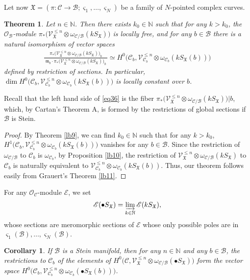 \documentclass[12pt,a4paper,notitlepage]{article}
\theoremstyle{definition}
\theoremstyle{plain}
\newtheorem{thm}[df]{Theorem}
\newtheorem{co}[df]{Corollary}
\newcommand{\fk}{\mathfrak}
\newcommand{\mc}{\mathcal}
\newcommand{\scr}{\mathscr}
\newcommand{\sgm}{\varsigma}
\newcommand{\SX}{S_{\fk X}}
\newcommand{\mbb}{\mathbb}
\newcommand{\blt}{\bullet}
\newcommand{\Nbb}{\mathbb N}
\numberwithin{equation}{section}
\begin{document}
Let now $\fk X=(\pi:\mc C\rightarrow\mc B;\sgm_1,\dots,\sgm_N)$ be a family of $N$-pointed complex curves.

\begin{thm}\label{lb8}
Let $n\in\Nbb$. Then  there exists $k_0\in\mbb N$ such that for any $k>k_0$, the $\scr O_{\mc B}$-module  $\pi_*\big(\scr V_{\fk X}^{\leq n}\otimes\omega_{\mc C/\mc B}(k\SX)\big)$ is locally free, and for any $b\in\mc B$ there is a natural isomorphism of vector spaces
\begin{align}
	\frac{\pi_*\big(\scr V_{\fk X}^{\leq n}\otimes\omega_{\mc C/\mc B}(k\SX)\big)_b}{~\fk m_b\cdot\pi_*\big(\scr V_{\fk X}^{\leq n}\otimes\omega_{\mc C/\mc B}(k\SX)\big)_b~}\simeq H^0\big(\mc C_b,\scr V_{\mc C_b}^{\leq n}\otimes\omega_{\mc C_b}(k\SX(b))\big)\label{eq36}
\end{align} 
defined by  restriction of sections. In particular,  $\dim  H^0\big(\mc C_b,\scr V_{\mc C_b}^{\leq n}\otimes\omega_{\mc C_b}(k\SX(b))\big)$ is locally constant over $b$.
\end{thm}

Recall that the left hand side of \eqref{eq36} is the fiber $\pi_*\big(\scr V_{\fk X}^{\leq n}\otimes\omega_{\mc C/\mc B}(k\SX)\big)\big|b$, which, by Cartan's Theorem A, is formed by the restrictions of global sections if $\mc B$ is Stein.

\begin{proof}
By Theorem \ref{lb9}, we can find $k_0\in\Nbb$ such that for any $k>k_0$, $H^1\big(\mc C_b,\scr V_{\mc C_b}^{\leq n}\otimes\omega_{\mc C_b}(k\SX(b))\big)$ vanishes for any $b\in\mc B$. Since the restriction of $\omega_{\mc C/\mc B}$ to $\mc C_b$ is $\omega_{\mc C_b}$, by Proposition \ref{lb10}, the restriction of $\scr V_{\fk X}^{\leq n}\otimes\omega_{\mc C/\mc B}(k\SX)$ to $\mc C_b$ is naturally equivalent to $\scr V_{\mc C_b}^{\leq n}\otimes\omega_{\mc C_b}(k\SX(b))$.  Thus, our theorem follows easily from Grauert's Theorem \ref{lb11}.
\end{proof}


For any $\scr O_{\mc C}$-module $\scr E$, we \index{SX@$\blt\SX$} set
\begin{align*}
\scr E(\blt\SX)=\varinjlim_{k\in\Nbb}\scr E(k\SX),
\end{align*}
whose sections are meromorphic sections of $\scr E$ whose only possible poles are in $\sgm_1(\mc B),\dots,\sgm_N(\mc B)$.


\begin{co}\label{lb16}
If $\mc B$ is a Stein manifold, then for any $n\in\Nbb$ and any $b\in \mc B$, the restrictions to $\mc C_b$ of the elements of $H^0\big(\mc C,\scr V_{\fk X}^{\leq n}\otimes\omega_{\mc C/\mc B}(\blt\SX)\big)$  form the vector space $H^0\big(\mc C_b,\scr V_{\mc C_b}^{\leq n}\otimes\omega_{\mc C_b}(\blt\SX(b))\big)$.
\end{co}
\end{document}
